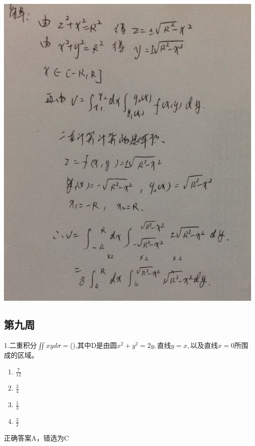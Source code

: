 \documentclass[fleqn]{article}
\begin{document}
\begin{flushleft}
\includegraphics[scale=0.5]{15.jpg}
\subsection{第九周}
1.二重积分$\iint xyd\sigma=$(),其中D是由圆$x^2+y^2=2y,$直线$y=x,$以及直线$x=0$所围成的区域。
\begin{enumerate}
	\item $\frac{7}{12}$
	\item $\frac{3}{4}$
	\item $\frac{1}{3}$
	\item $\frac{3}{2}$
\end{enumerate}
正确答案A，错选为C


\end{flushleft}
\end{document}
